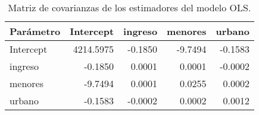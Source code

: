 \begin{table}
\caption{Matriz de covarianzas de los estimadores del modelo OLS.}
\label{tab:covarianzas_parametros}
\begin{tabular}{lrrrr}
\toprule
Parámetro & Intercept & ingreso & menores & urbano \\
\midrule
Intercept & 4214.5975 & -0.1850 & -9.7494 & -0.1583 \\
ingreso & -0.1850 & 0.0001 & 0.0001 & -0.0002 \\
menores & -9.7494 & 0.0001 & 0.0255 & 0.0002 \\
urbano & -0.1583 & -0.0002 & 0.0002 & 0.0012 \\
\bottomrule
\end{tabular}
\end{table}
